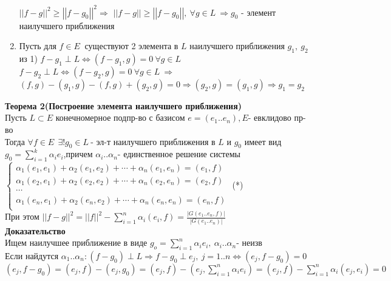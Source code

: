 \begin{enumerate}
       $\left| \left| f-g \right| \right|^2 \ge \left| \left| f-g_0 \right| \right|^2 \Rightarrow $
       $\left| \left| f-g \right| \right| \ge \left| \left| f-g_0 \right| \right| , \ \forall g \in L\ \Rightarrow g_0 $ - элемент наилучшего приближения
 \item Пусть для $f \in E\ $ существуют 2 элемента в $L$ наилучшего приближения $g_1, \ g_2$ \\
       из 1) $f-g_1 \perp L \Leftrightarrow (f-g_1,g)=0 \ \forall g \in L\ $ \\
       $f-g_2 \perp L \Leftrightarrow (f-g_2,g)=0 \ \forall g \in L\ \Rightarrow $ \\
       $(f,g)-(g_1,g)-(f,g) + (g_2,g)=0 \Rightarrow (g_2,g)=(g_1,g) \Rightarrow g_1=g_2$
\end{enumerate}
\textbf{Теорема 2(Построение элемента наилучшего приближения)} \\
Пусть $L \subset E$ конечномерное подпр-во с базисом $e=(e_1..e_n),E$- евклидово пр-во \\
Тогда $\forall f \in E\ \ \exists ! g_0 \in L\ $- эл-т наилучшего приближения в $L$ и $g_0$ имеет вид $g_0 = \sum \limits_{i=1}^k {\alpha_i e_i} $,причем $\alpha_i..\alpha_n$- единственное решение системы \\
$\left\{ \begin{matrix}
\mbox{$\alpha_1 (e_1,e_1) + \alpha_2 (e_1,e_2)+ \cdots +\alpha_n (e_1,e_n) = (e_1,f)$} \\
\mbox{$\alpha_1 (e_2,e_1) + \alpha_2 (e_2,e_2)+ \cdots +\alpha_n (e_2,e_n) = (e_2,f)$} \\
\mbox{$\cdots $} \\
\mbox{$\alpha_1 (e_n,e_1) + \alpha_2 (e_n,e_2)+ \cdots +\alpha_n (e_n,e_n) = (e_n,f)$} \\
\end{matrix}\right.$ (*) \\
При этом $\left| \left| f-g \right| \right|^2 = \left| \left| f \right| \right|^2-\sum \limits_{i=1}^n {\alpha_i(e_i,f)} = 
\frac{\left| G(e_1..e_n,f) \right|}{\left| G(e_1..e_n) \right|}  $ \\
\textbf{Доказательство} \\
Ищем наилучшее приближение в виде $g_o = \sum \limits_{i=1}^n {\alpha_i e_i}, \ \alpha_i..\alpha_n$- неизв \\
Если найдутся $\alpha_1..\alpha_n: (f-g_0) \perp L \Rightarrow f-g_0 \perp e_j, \ j=1..n \Leftrightarrow (e_j,f-g_0)=0$ \\
$(e_j,f-g_0)=(e_j,f)-(e_j,g_0) = (e_j,f)-(e_j, \sum \limits_{i=1}^n {\alpha_i e_i}) = (e_j,f)-\sum \limits_{i=1}^n{\alpha_i(e_j,e_i)=0}$ \\
